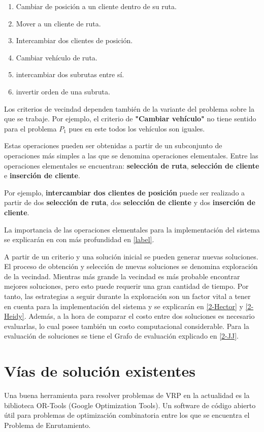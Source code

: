 \begin{enumerate}
	\item Cambiar de posición a un cliente dentro de su ruta.
	\item Mover a un cliente de ruta.
	\item Intercambiar dos clientes de posición.
	\item Cambiar vehículo de ruta.
	\item intercambiar dos subrutas entre sí.
	\item invertir orden de una subruta. 
\end{enumerate}

Los criterios de vecindad dependen también de la variante del problema sobre la que se trabaje. Por ejemplo, el criterio de \textbf{"Cambiar vehículo"} no tiene sentido para el problema $P_1$ pues en este todos los vehículos son iguales.

Estas operaciones pueden ser obtenidas a partir de un subconjunto de operaciones más simples a las que se denomina operaciones elementales. Entre las operaciones elementales se encuentran: \textbf{selección de ruta}, \textbf{selección de cliente} e \textbf{inserción de cliente}.

Por ejemplo, \textbf{intercambiar dos clientes de posición} puede ser realizado a partir de dos \textbf{selección de ruta}, dos \textbf{selección de cliente} y dos \textbf{inserción de cliente}.

La importancia de las operaciones elementales para la implementación del sistema se explicarán en con más profundidad en \ref{label}.

A partir de un criterio y una solución inicial se pueden generar nuevas soluciones. El proceso de obtención y selección de nuevas soluciones se denomina exploración de la vecindad. Mientras más grande la vecindad es más probable encontrar mejores soluciones, pero esto puede requerir una gran cantidad de tiempo. Por tanto, las estrategias a seguir durante la exploración son un factor vital a tener en cuenta para la implementación del sistema y se explicarán en \ref{2-Hector} y \ref{2-Heidy}. Además, a la hora de comparar el costo entre dos soluciones es necesario evaluarlas, lo cual posee también un costo computacional considerable. Para la evaluación de soluciones se tiene el Grafo de evaluación explicado en \ref{2-JJ}.

\section{Vías de solución existentes}\label{2-Libr}
Una buena herramienta para resolver problemas de VRP en la actualidad es la biblioteca OR-Tools (Google Optimization Tools). Un software de código abierto útil para problemas de optimización combinatoria entre los que se encuentra el Problema de Enrutamiento.

